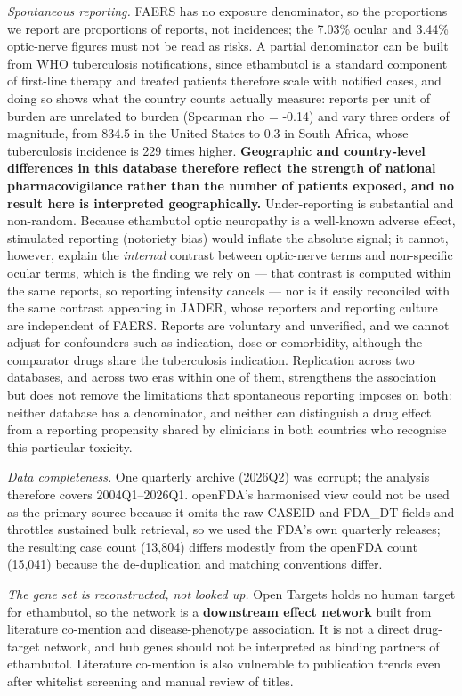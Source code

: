 \documentclass[utf8]{FrontiersinVancouver}
\begin{document}
\textit{Spontaneous reporting.} FAERS has no exposure denominator, so the proportions we report are proportions of reports, not incidences; the 7.03\% ocular and 3.44\% optic-nerve figures must not be read as risks. A partial denominator can be built from WHO tuberculosis notifications, since ethambutol is a standard component of first-line therapy and treated patients therefore scale with notified cases, and doing so shows what the country counts actually measure: reports per unit of burden are unrelated to burden (Spearman rho = -0.14) and vary three orders of magnitude, from 834.5 in the United States to 0.3 in South Africa, whose tuberculosis incidence is 229 times higher. \textbf{Geographic and country-level differences in this database therefore reflect the strength of national pharmacovigilance rather than the number of patients exposed, and no result here is interpreted geographically.} Under-reporting is substantial and non-random. Because ethambutol optic neuropathy is a well-known adverse effect, stimulated reporting (notoriety bias) would inflate the absolute signal; it cannot, however, explain the \textit{internal} contrast between optic-nerve terms and non-specific ocular terms, which is the finding we rely on --- that contrast is computed within the same reports, so reporting intensity cancels --- nor is it easily reconciled with the same contrast appearing in JADER, whose reporters and reporting culture are independent of FAERS. Reports are voluntary and unverified, and we cannot adjust for confounders such as indication, dose or comorbidity, although the comparator drugs share the tuberculosis indication. Replication across two databases, and across two eras within one of them, strengthens the association but does not remove the limitations that spontaneous reporting imposes on both: neither database has a denominator, and neither can distinguish a drug effect from a reporting propensity shared by clinicians in both countries who recognise this particular toxicity.

\textit{Data completeness.} One quarterly archive (2026Q2) was corrupt; the analysis therefore covers 2004Q1--2026Q1. openFDA's harmonised view could not be used as the primary source because it omits the raw CASEID and FDA\_DT fields and throttles sustained bulk retrieval, so we used the FDA's own quarterly releases; the resulting case count (13,804) differs modestly from the openFDA count (15,041) because the de-duplication and matching conventions differ.

\textit{The gene set is reconstructed, not looked up.} Open Targets holds no human target for ethambutol, so the network is a \textbf{downstream effect network} built from literature co-mention and disease-phenotype association. It is not a direct drug-target network, and hub genes should not be interpreted as binding partners of ethambutol. Literature co-mention is also vulnerable to publication trends even after whitelist screening and manual review of titles.
\end{document}

